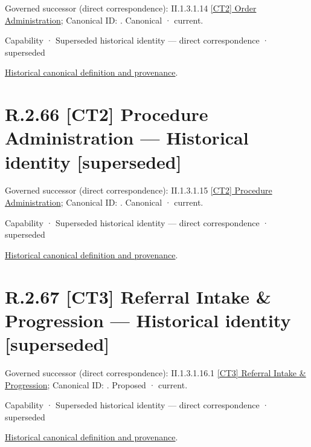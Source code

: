 {\small Governed successor (direct correspondence): II.1.3.1.14 \hyperref[element:c3c5abd7987f4433a46cbfed8167914c]{[CT2] Order Administration}; Canonical ID: \texttt{}. Canonical · current.}\par
\label{element:ebb735a2915744819d4001d9b8425cc6}
{\small Capability · Superseded historical identity — direct correspondence · superseded}\par
\href{../../../../continuum/strategy/capability/ebb735a2915744819d4001d9b8425cc6.md}{Historical canonical definition and provenance}.\par
\section*{R.2.66 [CT2] Procedure Administration — Historical identity [superseded]}
\label{navigation:R.2.66}

{\small Governed successor (direct correspondence): II.1.3.1.15 \hyperref[element:649dd7cc26094e539386a050086dfb91]{[CT2] Procedure Administration}; Canonical ID: \texttt{}. Canonical · current.}\par
\label{element:466a4057001846bb8ae0481453d3e410}
{\small Capability · Superseded historical identity — direct correspondence · superseded}\par
\href{../../../../continuum/strategy/capability/466a4057001846bb8ae0481453d3e410.md}{Historical canonical definition and provenance}.\par
\section*{R.2.67 [CT3] Referral Intake \& Progression — Historical identity [superseded]}
\label{navigation:R.2.67}

{\small Governed successor (direct correspondence): II.1.3.1.16.1 \hyperref[element:d11bdb9464b2476894aa372ab9b929a7]{[CT3] Referral Intake \& Progression}; Canonical ID: \texttt{}. Proposed · current.}\par
\label{element:7180f6265d5c4687a001220c6126e301}
{\small Capability · Superseded historical identity — direct correspondence · superseded}\par
\href{../../../../continuum/strategy/capability/7180f6265d5c4687a001220c6126e301.md}{Historical canonical definition and provenance}.\par
